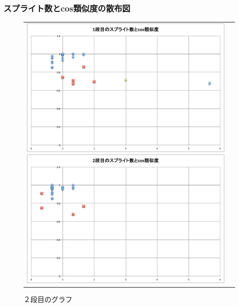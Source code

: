 \documentclass[twocolumn,9pt,a4paper]{jsarticle}
\begin{document}
\subsubsection{スプライト数とcos類似度の散布図}
\begin{figure}[ht]
 \begin{tabular}{cc}
 	\begin{minipage}[t]{0.45\hsize}
	 \centering
	 \includegraphics[keepaspectratio, scale = 0.14]{mazegame_first_splite.pdf}
	 \caption{１段目のグラフ}
	 \label{first_splite}
	\end{minipage}
        \begin{minipage}[t]{0.45\hsize}
	 \centering
	 \includegraphics[keepaspectratio, scale = 0.14]{mazegame_second_splite.pdf}
	 \caption{２段目のグラフ}
	 \label{second_splite}
	\end{minipage}
 \end{tabular}
 \end{figure}
 
\end{document}
